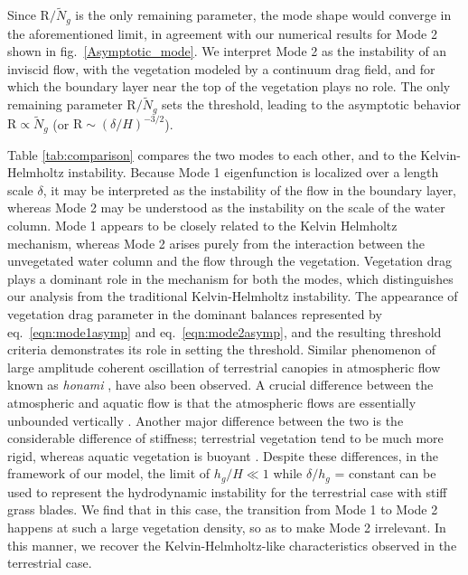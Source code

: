 \documentclass[aps,prl,twocolumn,superscriptaddress,10pt]{revtex4-1}  %
\newcommand{\hg}{h_g}
\newcommand{\Rey}{\text{R}}
\newcommand{\Ndg}{\tilde{N}_g}
\begin{document}
Since $\Rey/\Ndg$ is the only remaining parameter, the mode shape would converge in the aforementioned limit, in agreement with our numerical results for Mode 2 shown in fig.~\ref{Asymptotic_mode}. 
We interpret Mode 2 as the instability of an inviscid flow, with the vegetation modeled by a continuum drag field, and for which the boundary layer near the top of the vegetation plays no role. The only remaining parameter $\Rey/\Ndg$ 
sets the threshold, leading to the asymptotic behavior $\Rey \propto \Ndg$ (or $\Rey \sim ({\delta}/{H})^{-3/2}$).

Table \ref{tab:comparison} compares the two modes to each other, and to the Kelvin-Helmholtz instability. 
Because Mode 1 eigenfunction is localized over a length scale $\delta$, it may be interpreted as the instability of the flow in the boundary layer, whereas Mode 2 may be understood as the instability on the scale of the water column. 
Mode 1 appears to be closely related to the Kelvin Helmholtz mechanism, whereas Mode 2 arises purely from the interaction between the unvegetated water column and the flow through the vegetation. 
Vegetation drag plays a dominant role in the mechanism for both the modes, which distinguishes our analysis from the traditional Kelvin-Helmholtz instability. 
The appearance of vegetation drag parameter in the dominant balances represented by eq.~\eqref{eqn:mode1asymp} and eq.~\eqref{eqn:mode2asymp}, and the resulting threshold criteria demonstrates its role in setting the threshold.
\newline
Similar phenomenon of large amplitude coherent oscillation of terrestrial canopies in atmospheric flow known as \textit{honami} \cite{Inoue56,Raupach96}, have also been observed.
A crucial difference between the atmospheric and aquatic flow is that the atmospheric flows are essentially unbounded vertically \cite{Vivoni98,Nepf00}. 
Another major difference between the two is the considerable difference of stiffness; terrestrial vegetation tend to be much more rigid, whereas aquatic vegetation is buoyant \cite{Vivoni98,Ghisal02}. 
Despite these differences, in the framework of our model, the limit of $\hg/H \ll 1$ while $\delta/\hg$ = constant can be used to represent the hydrodynamic instability for the terrestrial case with stiff grass blades. We find that in this case, the transition from Mode 1 to Mode 2 happens at such a large vegetation density, so as to make Mode 2 irrelevant. In this manner, we recover the Kelvin-Helmholtz-like characteristics observed in the terrestrial case. 
\end{document}
